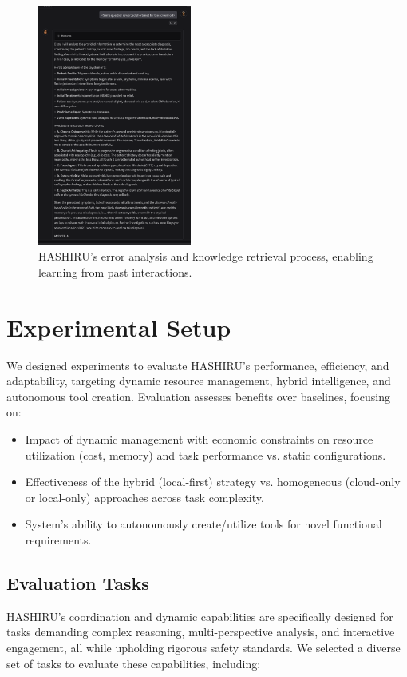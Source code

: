 \documentclass[conference]{IEEEtran}
\begin{document}
\begin{figure}[h]
    \centering
    \includegraphics[width=0.45\textwidth]{casestudy4.png}
    \caption{HASHIRU's error analysis and knowledge retrieval process, enabling learning from past interactions.}
    \label{fig:error_analysis}
\end{figure}

\section{Experimental Setup}
\label{sec:experiments}

We designed experiments to evaluate HASHIRU's performance, efficiency, and adaptability, targeting dynamic resource management, hybrid intelligence, and autonomous tool creation. Evaluation assesses benefits over baselines, focusing on:
\begin{itemize}
    \item Impact of dynamic management with economic constraints on resource utilization (cost, memory) and task performance vs. static configurations.
    \item Effectiveness of the hybrid (local-first) strategy vs. homogeneous (cloud-only or local-only) approaches across task complexity.
    \item System's ability to autonomously create/utilize tools for novel functional requirements.
\end{itemize}

\subsection{Evaluation Tasks}
\label{subsec:tasks}
HASHIRU's coordination and dynamic capabilities are specifically designed for tasks demanding complex reasoning, multi-perspective analysis, and interactive engagement, all while upholding rigorous safety standards. We selected a diverse set of tasks to evaluate these capabilities, including:
\end{document}
